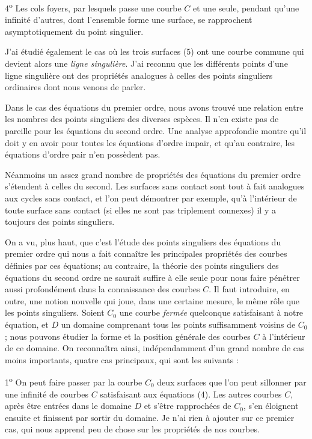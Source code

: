 \documentclass[11pt]{article}
\begin{document}
4\textsuperscript{o} Les cols foyers, par lesquels passe une courbe $C$ et une seule, pendant qu’une infinité d’autres, dont l’ensemble forme une surface, se rapprochent asymptotiquement du point singulier.

J’ai étudié également le cas où les trois surfaces (5) ont une courbe commune qui devient alors une \emph{ligne singulière}. J’ai reconnu que les différents points d’une ligne singulière ont des propriétés analogues à celles des points singuliers ordinaires dont nous venons de parler.

Dans le cas des équations du premier ordre, nous avons trouvé une relation entre les nombres des points singuliers des diverses espèces. Il n’en existe pas de pareille pour les équations du second ordre. Une analyse approfondie montre qu’il doit y en avoir pour toutes les équations d’ordre impair, et qu’au contraire, les équations d’ordre pair n’en possèdent pas.

Néanmoins un assez grand nombre de propriétés des équations du premier ordre s’étendent à celles du second. Les surfaces sans contact sont tout à fait analogues aux cycles sans contact, et l’on peut démontrer par exemple, qu’à l’intérieur de toute surface sans contact (si elles ne sont pas triplement connexes) il y a toujours des points singuliers.

On a vu, plus haut, que c’est l’étude des points singuliers des équations du premier ordre qui nous a fait connaître les principales propriétés des courbes définies par ces équations; au contraire, la théorie des points singuliers des équations du second ordre ne saurait suffire à elle seule pour nous faire pénétrer aussi profondément dans la connaissance des courbes $C$. Il faut introduire, en outre, une notion nouvelle qui joue, dans une certaine mesure, le même rôle que les points singuliers. Soient $C_0$ une courbe \emph{fermée} quelconque satisfaisant à notre équation, et $D$ un domaine comprenant tous les points suffisamment voisins de $C_0$; nous pouvons étudier la forme et la position générale des courbes $C$ à l’intérieur de ce domaine. On reconnaîtra ainsi, indépendamment d’un grand nombre de cas moins importants, quatre cas principaux, qui sont les suivants :

1\textsuperscript{o} On peut faire passer par la courbe $C_0$ deux surfaces que l’on peut sillonner par une infinité de courbes $C$ satisfaisant aux équations (4). Les autres courbes $C$, après être entrées dans le domaine $D$ et s’être rapprochées de $C_0$, s’en éloignent ensuite et finissent par sortir du domaine. Je n’ai rien à ajouter sur ce premier cas, qui nous apprend peu de chose sur les propriétés de nos courbes.
\end{document}
